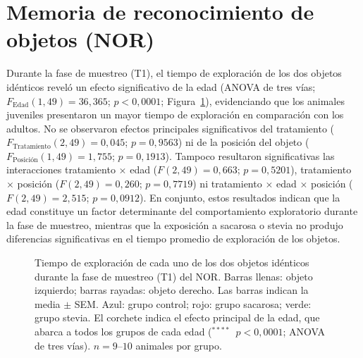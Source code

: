 \section{Memoria de reconocimiento de objetos (NOR)}\label{sec:res-nor}

Durante la fase de muestreo (T1), el tiempo de exploración de los dos objetos idénticos reveló un efecto significativo de la edad (ANOVA de tres vías; $F_{\text{Edad}}(1, 49) = 36{,}365$; $p < 0{,}0001$; Figura~\ref{fig:nor-t1}), evidenciando que los animales juveniles presentaron un mayor tiempo de exploración en comparación con los adultos. No se observaron efectos principales significativos del tratamiento ($F_{\text{Tratamiento}}(2, 49) = 0{,}045$; $p = 0{,}9563$) ni de la posición del objeto ($F_{\text{Posición}}(1, 49) = 1{,}755$; $p = 0{,}1913$). Tampoco resultaron significativas las interacciones tratamiento $\times$ edad ($F(2, 49) = 0{,}663$; $p = 0{,}5201$), tratamiento $\times$ posición ($F(2, 49) = 0{,}260$; $p = 0{,}7719$) ni tratamiento $\times$ edad $\times$ posición ($F(2, 49) = 2{,}515$; $p = 0{,}0912$). En conjunto, estos resultados indican que la edad constituye un factor determinante del comportamiento exploratorio durante la fase de muestreo, mientras que la exposición a sacarosa o stevia no produjo diferencias significativas en el tiempo promedio de exploración de los objetos.

\begin{figure}[htbp]
  \centering
  \caption[Exploración de los objetos en la fase de muestreo del NOR]{Tiempo de exploración de cada uno de los dos objetos idénticos durante la fase de muestreo (T1) del NOR. Barras llenas: objeto izquierdo; barras rayadas: objeto derecho. Las barras indican la media $\pm$ SEM. Azul: grupo control; rojo: grupo sacarosa; verde: grupo stevia. El corchete indica el efecto principal de la edad, que abarca a todos los grupos de cada edad ($^{****}$~$p < 0{,}0001$; ANOVA de tres vías). $n = 9$--$10$ animales por grupo.}
  \label{fig:nor-t1}
\end{figure}

